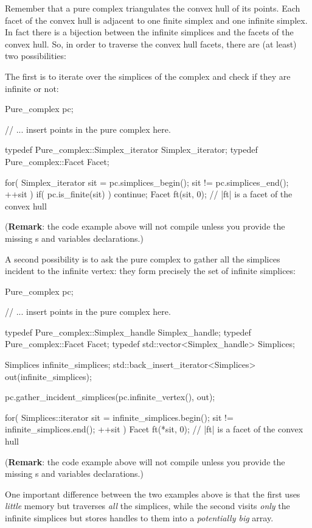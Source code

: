 {Remember that a pure complex triangulates the convex hull of its points. Each
facet of the convex hull is adjacent to one finite simplex and one infinite
simplex. In fact there is a bijection between the infinite simplices and the
facets of the convex hull. So, in order to traverse the convex hull facets,
there are (at least) two possibilities:

The first is to iterate over the simplices of the complex and check if they
are infinite or not:

\begin{ccExampleCode}
Pure_complex pc;

// ... insert points in the pure complex here.

typedef Pure_complex::Simplex_iterator Simplex_iterator;
typedef Pure_complex::Facet Facet;

for( Simplex_iterator sit = pc.simplices_begin(); sit != pc.simplices_end(); ++sit )
{
    if( pc.is_finite(sit) )
        continue;
    Facet ft(sit, 0); // |ft| is a facet of the convex hull
}
\end{ccExampleCode}
(\textbf{Remark}: the code example above will not compile unless you provide
the missing s and variables declarations.)

A second possibility is to ask the pure complex to gather all the simplices
incident to the infinite vertex: they form precisely the set of infinite
simplices:

\begin{ccExampleCode}
Pure_complex pc;

// ... insert points in the pure complex here.

typedef Pure_complex::Simplex_handle Simplex_handle;
typedef Pure_complex::Facet Facet;
typedef std::vector<Simplex_handle> Simplices;

Simplices infinite_simplices;
std::back_insert_iterator<Simplices> out(infinite_simplices);

pc.gather_incident_simplices(pc.infinite_vertex(), out);

for( Simplices::iterator sit = infinite_simplices.begin(); sit != infinite_simplices.end(); ++sit )
{
    Facet ft(*sit, 0); // |ft| is a facet of the convex hull
}
\end{ccExampleCode}
(\textbf{Remark}: the code example above will not compile unless you provide
the missing s and variables declarations.)

One important difference between the two examples above is that the first uses
\emph{little} memory but traverses \emph{all} the simplices, while the second
visits \emph{only} the infinite simplices but stores handles to them into a
\emph{potentially big} array.

}
